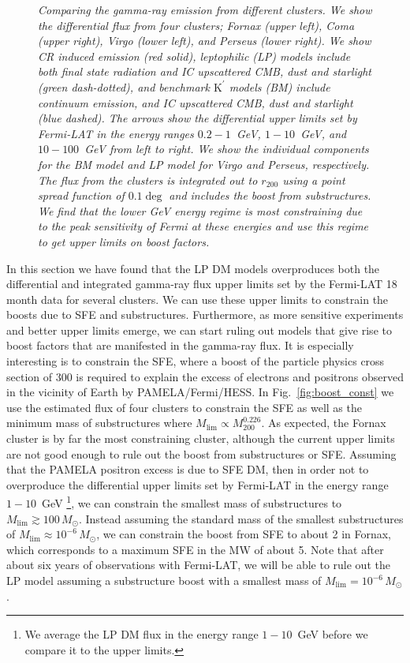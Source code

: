 \documentclass[10pt,aps,pra,reprint,amsmath,amsfonts,amssymb,showpacs,nofootinbib,floatfix]{revtex4-1}
\newcommand{\rmn}{\mathrm}
\newcommand{\msun}{M_\odot}
\newcommand{\Kp}{\rmn{K}^\prime}
\newcommand{\rvir}{r_{200}}
\newcommand{\mvir}{M_{200}}
\begin{document}
\begin{figure}
\begin{minipage}{2.0\columnwidth}
\caption{\it Comparing the gamma-ray emission from different
  clusters. We show the differential flux from four clusters; Fornax
  (upper left), Coma (upper right), Virgo (lower left), and Perseus
  (lower right). We show CR induced emission (red solid), leptophilic
  (LP) models include both final state radiation and IC upscattered
  CMB, dust and starlight (green dash-dotted), and benchmark $\Kp$
  models (BM) include continuum emission, and IC upscattered CMB, dust
  and starlight (blue dashed). The arrows show the differential upper
  limits set by Fermi-LAT in the energy ranges $0.2-1$~GeV,
  $1-10$~GeV, and $10-100$~GeV from left to right. We show the
  individual components for the BM model and LP model for Virgo and
  Perseus, respectively. The flux from the clusters is integrated out
  to $\rvir$ using a point spread function of $0.1\deg$ and includes
  the boost from substructures. We find that the lower GeV energy
  regime is most constraining due to the peak sensitivity of Fermi at
  these energies and use this regime to get upper limits on boost
  factors.}
 \label{fig:clu_comp}
\end{minipage}
\end{figure}


In this section we have found that the LP DM models overproduces both
the differential and integrated gamma-ray flux upper limits set by the
Fermi-LAT 18 month data for several clusters. We can use these upper
limits to constrain the boosts due to SFE and
substructures. Furthermore, as more sensitive experiments and better
upper limits emerge, we can start ruling out models that give rise to
boost factors that are manifested in the gamma-ray flux. It is
especially interesting is to constrain the SFE, where a boost of the
particle physics cross section of 300 is required to explain the
excess of electrons and positrons observed in the vicinity of Earth by
PAMELA/Fermi/HESS. In Fig.~\ref{fig:boost_const} we use the estimated
flux of four clusters to constrain the SFE as well as the minimum mass
of substructures where $M_\rmn{lim}\propto\mvir^{0.226}$. As expected,
the Fornax cluster is by far the most constraining cluster, although
the current upper limits are not good enough to rule out the boost
from substructures or SFE. Assuming that the PAMELA positron excess is
due to SFE DM, then in order not to overproduce the differential upper
limits set by Fermi-LAT in the energy range $1-10$~GeV \footnote{We
  average the LP DM flux in the energy range $1-10$~GeV before we
  compare it to the upper limits.}, we can constrain the smallest mass
of substructures to $M_\rmn{lim}\gtrsim 100\,\msun$. Instead assuming
the standard mass of the smallest substructures of $M_\rmn{lim}\approx
10^{-6}\,\msun$, we can constrain the boost from SFE to about 2 in
Fornax, which corresponds to a maximum SFE in the MW of about 5. Note
that after about six years of observations with Fermi-LAT, we will be
able to rule out the LP model assuming a substructure boost with a
smallest mass of $M_\rmn{lim} = 10^{-6}\,\msun$.
\end{document}
